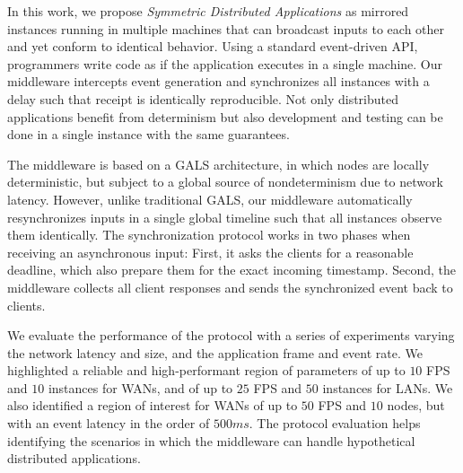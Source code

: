 \documentclass[sigplan,screen]{acmart}
\begin{document}
In this work, we propose \emph{Symmetric Distributed Applications} as mirrored
instances running in multiple machines that can broadcast inputs to each other
and yet conform to identical behavior.
%
Using a standard event-driven API, programmers write code as if the application
executes in a single machine.
Our middleware intercepts event generation and synchronizes all instances with
a delay such that receipt is identically reproducible.
%
Not only distributed applications benefit from determinism but also development
and testing can be done in a single instance with the same guarantees.

The middleware is based on a GALS architecture, in which nodes are locally
deterministic, but subject to a global source of nondeterminism due to network
latency.
However, unlike traditional GALS, our middleware automatically resynchronizes
inputs in a single global timeline such that all instances observe them
identically.
The synchronization protocol works in two phases when receiving an asynchronous
input:
First, it asks the clients for a reasonable deadline, which also prepare them
for the exact incoming timestamp.
Second, the middleware collects all client responses and sends the synchronized
event back to clients.

We evaluate the performance of the protocol with a series of experiments
varying the network latency and size, and the application frame and event rate.
%
We highlighted a reliable and high-performant region of parameters of up to
$10$ FPS and $10$ instances for WANs, and of up to $25$ FPS and $50$ instances
for LANs.
We also identified a region of interest for WANs of up to $50$ FPS and $10$
nodes, but with an event latency in the order of $500ms$.
%
The protocol evaluation helps identifying the scenarios in which the middleware
can handle hypothetical distributed applications.



\end{document}
